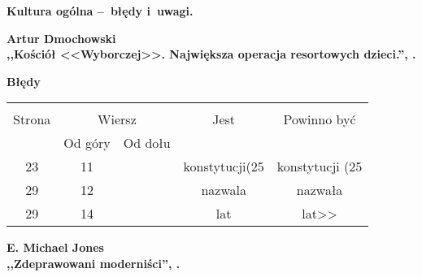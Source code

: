 \documentclass[a4paper]{article}
\newcommand{\spaceTwo}{2em}
\newcommand{\spaceThree}{1em}
\newcommand{\tb}{\textbf}
\newcommand{\Center}[1]{\begin{center} #1 \end{center}}
\newcommand{\CenterTB}[1]{\Center{\tb{#1}}}
\newcommand{\Work}[1]{ \begin{center} {\large \tb{#1}} \end{center} }
\newcommand{\Main}[1]{ \begin{center} {\LARGE \tb{#1} } \end{center} }
\begin{document}



\Main{Kultura ogólna --~błędy i~uwagi.}

\vspace{\spaceThree}



\Work{
  Artur Dmochowski \\
  ,,Kościół <<Wyborczej>>. Największa operacja resortowych dzieci.'',
  \cite{Dmo14}.}


\CenterTB{Błędy}
\begin{center}
  \begin{tabular}{|c|c|c|c|c|}
    \hline
    & \multicolumn{2}{c|}{} & & \\
    Strona & \multicolumn{2}{c|}{Wiersz}& Jest & Powinno być \\ \cline{2-3}
    & Od góry & Od dołu &  &  \\ \hline
    23 & 11 & & konstytucji(25 & konstytucji (25 \\
    29 & 12 & & nazwala & nazwała \\
    29 & 14 & & lat & lat>> \\ \hline
  \end{tabular}
\end{center}

\vspace{\spaceTwo}



\newpage





\Work{
  E. Michael Jones \\
  ,,Zdeprawowani moderniści'', \cite{MJ14}.}
\end{document}
